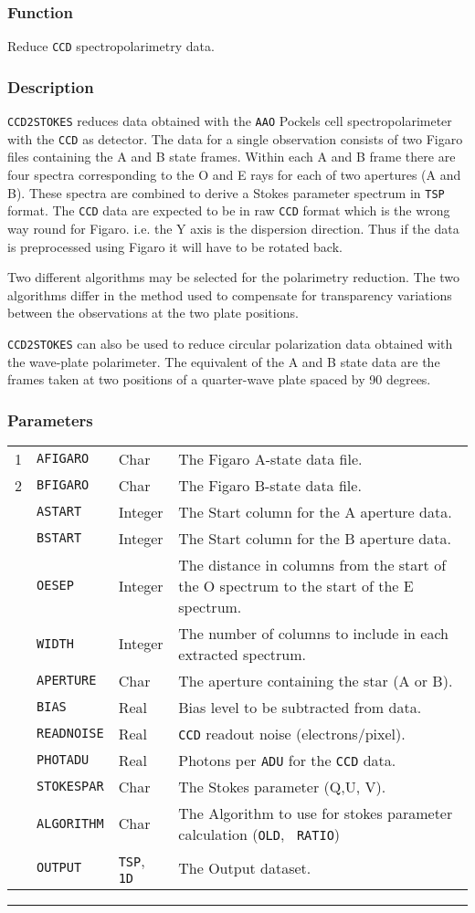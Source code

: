 \documentclass[11pt,twoside,nolof,noabs]{starlink}
\newenvironment{manroutinedescription}{}{\par{}\rule{\textwidth}{0.5mm}}
\newcommand{\manroutineitem}[2]{\subsubsection*{#1}#2\par{}}
\newenvironment{manparametertable}{\begin{tabular}{lllp{80mm}}}%
{\end{tabular}}
\newcommand{\manparameterentry}[3]{\\#1 & #2 & #3 & }
\providecommand{\mantt}[1]{\texttt{#1}}
\begin{document}
\begin{manroutinedescription}
\manroutineitem{Function}{}
        Reduce {\mantt{CCD}} spectropolarimetry data.

\manroutineitem{Description}{}
        {\mantt{CCD2STOKES}} reduces data obtained with the {\mantt{AAO}} %
Pockels cell
        spectropolarimeter with the {\mantt{CCD}} as detector. The data for a
        single observation consists of two Figaro files containing the
        A and B state frames. Within each A and B frame there are four
        spectra corresponding to the O and E rays for each of two
        apertures (A and B). These spectra are combined
        to derive a Stokes parameter spectrum in {\mantt{TSP}} format.
        The {\mantt{CCD}} data are expected to be in raw {\mantt{CCD}} format %
which is
        the wrong way round for Figaro. i.e. the Y axis is the dispersion
        direction. Thus if the data is preprocessed using Figaro it will
        have to be rotated back.

        Two different algorithms may be selected for the polarimetry
        reduction. The two algorithms differ in the method used to
        compensate for transparency variations between the observations
        at the two plate positions.

        {\mantt{CCD2STOKES}} can also be used to reduce circular polarization
        data obtained with the wave-plate polarimeter. The equivalent of
        the A and B state data are the frames taken at two positions of
        a quarter-wave plate spaced by 90 degrees.

\manroutineitem{Parameters}{}
\begin{manparametertable}
\manparameterentry{1}{{\mantt{AFIGARO}}}{Char}     The Figaro A-state data file.
\manparameterentry{2}{{\mantt{BFIGARO}}}{Char}     The Figaro B-state data file.
\manparameterentry{}{{\mantt{ASTART}}}{Integer}  The Start column for the A %
aperture data.
\manparameterentry{}{{\mantt{BSTART}}}{Integer}  The Start column for the B %
aperture data.
\manparameterentry{}{{\mantt{OESEP}}}{Integer}  The distance in columns from %
the start of the O
                               spectrum to the start of the E spectrum.
\manparameterentry{}{{\mantt{WIDTH}}}{Integer}  The number of columns to %
include in each
                               extracted spectrum.
\manparameterentry{}{{\mantt{APERTURE}}}{Char}     The aperture containing the %
star (A or B).
\manparameterentry{}{{\mantt{BIAS}}}{Real}     Bias level to be subtracted %
from data.
\manparameterentry{}{{\mantt{READNOISE}}}{Real}     {\mantt{CCD}} readout %
noise (electrons/pixel).
\manparameterentry{}{{\mantt{PHOTADU}}}{Real}     Photons per {\mantt{ADU}} %
for the {\mantt{CCD}} data.
\manparameterentry{}{{\mantt{STOKESPAR}}}{Char}     The Stokes parameter (Q,U,%
V).
\manparameterentry{}{{\mantt{ALGORITHM}}}{Char}     The Algorithm to use for %
stokes
                               parameter calculation ({\mantt{OLD}}, {\mantt{%
RATIO}})
\manparameterentry{}{{\mantt{OUTPUT}}}{{\mantt{TSP}}, {\mantt{1D}}}  The %
Output dataset.


\end{manparametertable}
\end{manroutinedescription}
\end{document}

